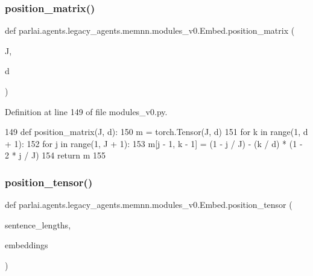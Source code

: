 \subsubsection{\texorpdfstring{position\+\_\+matrix()}{position\_matrix()}}
{\footnotesize\ttfamily def parlai.\+agents.\+legacy\+\_\+agents.\+memnn.\+modules\+\_\+v0.\+Embed.\+position\+\_\+matrix (\begin{DoxyParamCaption}\item[{}]{J,  }\item[{}]{d }\end{DoxyParamCaption})}



Definition at line 149 of file modules\+\_\+v0.\+py.


\begin{DoxyCode}
149     \textcolor{keyword}{def }position\_matrix(J, d):
150         m = torch.Tensor(J, d)
151         \textcolor{keywordflow}{for} k \textcolor{keywordflow}{in} range(1, d + 1):
152             \textcolor{keywordflow}{for} j \textcolor{keywordflow}{in} range(1, J + 1):
153                 m[j - 1, k - 1] = (1 - j / J) - (k / d) * (1 - 2 * j / J)
154         \textcolor{keywordflow}{return} m
155 
\end{DoxyCode}
\mbox{\label{classparlai_1_1agents_1_1legacy__agents_1_1memnn_1_1modules__v0_1_1Embed_a40a4aebba88622f6734725da0a1fd12d}} 
\subsubsection{\texorpdfstring{position\+\_\+tensor()}{position\_tensor()}}
{\footnotesize\ttfamily def parlai.\+agents.\+legacy\+\_\+agents.\+memnn.\+modules\+\_\+v0.\+Embed.\+position\+\_\+tensor (\begin{DoxyParamCaption}\item[{}]{sentence\+\_\+lengths,  }\item[{}]{embeddings }\end{DoxyParamCaption})\hspace{0.3cm}{\ttfamily [static]}}



